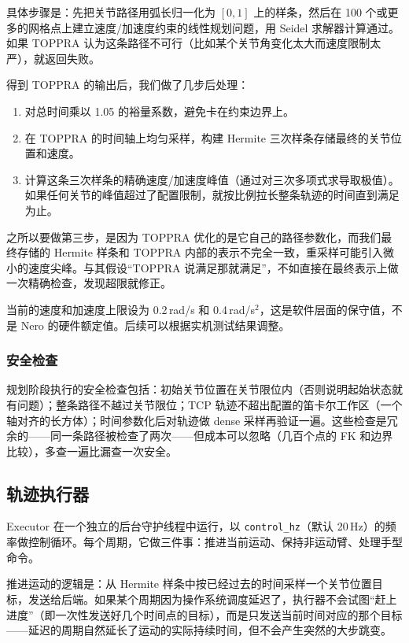具体步骤是：先把关节路径用弧长归一化为 $[0, 1]$ 上的样条，然后在 100 个或更多的网格点上建立速度/加速度约束的线性规划问题，用 Seidel 求解器计算通过。如果 TOPPRA 认为这条路径不可行（比如某个关节角变化太大而速度限制太严），就返回失败。

得到 TOPPRA 的输出后，我们做了几步后处理：

\begin{enumerate}
  \item 对总时间乘以 1.05 的裕量系数，避免卡在约束边界上。
  \item 在 TOPPRA 的时间轴上均匀采样，构建 Hermite 三次样条存储最终的关节位置和速度。
  \item 计算这条三次样条的精确速度/加速度峰值（通过对三次多项式求导取极值）。如果任何关节的峰值超过了配置限制，就按比例拉长整条轨迹的时间直到满足为止。
\end{enumerate}

之所以要做第三步，是因为 TOPPRA 优化的是它自己的路径参数化，而我们最终存储的 Hermite 样条和 TOPPRA 内部的表示不完全一致，重采样可能引入微小的速度尖峰。与其假设``TOPPRA 说满足那就满足''，不如直接在最终表示上做一次精确检查，发现超限就修正。

当前的速度和加速度上限设为 0.2\,rad/s 和 0.4\,rad/s$^2$，这是软件层面的保守值，不是 Nero 的硬件额定值。后续可以根据实机测试结果调整。

\subsubsection{安全检查}

规划阶段执行的安全检查包括：初始关节位置在关节限位内（否则说明起始状态就有问题）；整条路径不越过关节限位；TCP 轨迹不超出配置的笛卡尔工作区（一个轴对齐的长方体）；时间参数化后对轨迹做 dense 采样再验证一遍。这些检查是冗余的——同一条路径被检查了两次——但成本可以忽略（几百个点的 FK 和边界比较），多查一遍比漏查一次安全。


\subsection{轨迹执行器}
\label{subsec:agent-executor}

Executor 在一个独立的后台守护线程中运行，以 \texttt{control\_hz}（默认 20\,Hz）的频率做控制循环。每个周期，它做三件事：推进当前运动、保持非运动臂、处理手型命令。

推进运动的逻辑是：从 Hermite 样条中按已经过去的时间采样一个关节位置目标，发送给后端。如果某个周期因为操作系统调度延迟了，执行器不会试图``赶上进度''（即一次性发送好几个时间点的目标），而是只发送当前时间对应的那个目标——延迟的周期自然延长了运动的实际持续时间，但不会产生突然的大步跳变。

